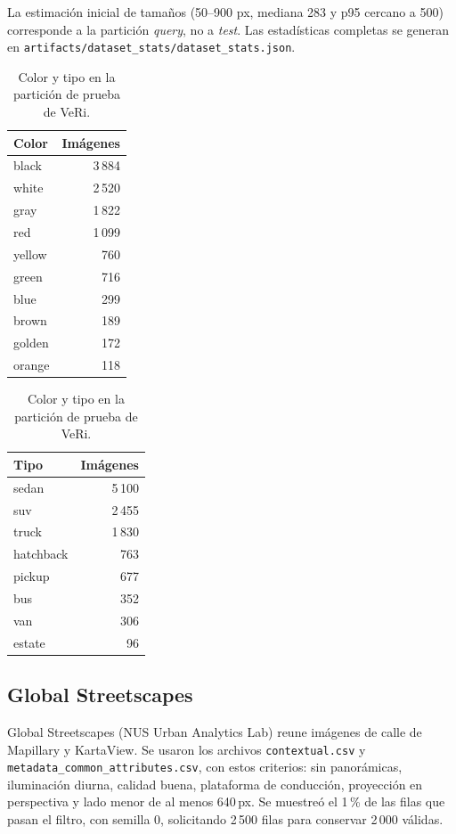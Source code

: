 \documentclass[11pt,a4paper]{article}
\begin{document}
La estimaci\'on inicial de tama\~nos (50--900 px, mediana 283 y p95 cercano a 500)
corresponde a la partici\'on \emph{query}, no a \emph{test}. Las estad\'isticas completas
se generan en \texttt{artifacts/dataset\_stats/dataset\_stats.json}.

\begin{table}[ht]
\centering
\begin{minipage}[t]{0.45\textwidth}
\centering
\begin{tabular}{@{}lr@{}}
\toprule
Color & Im\'agenes \\
\midrule
black & 3\,884 \\ white & 2\,520 \\ gray & 1\,822 \\ red & 1\,099 \\
yellow & 760 \\ green & 716 \\ blue & 299 \\ brown & 189 \\
golden & 172 \\ orange & 118 \\
\bottomrule
\end{tabular}
\end{minipage}\hfill
\begin{minipage}[t]{0.45\textwidth}
\centering
\begin{tabular}{@{}lr@{}}
\toprule
Tipo & Im\'agenes \\
\midrule
sedan & 5\,100 \\ suv & 2\,455 \\ truck & 1\,830 \\ hatchback & 763 \\
pickup & 677 \\ bus & 352 \\ van & 306 \\ estate & 96 \\
\bottomrule
\end{tabular}
\end{minipage}
\caption{Color y tipo en la partici\'on de prueba de VeRi.}
\end{table}

\subsection{Global Streetscapes}

Global Streetscapes (NUS Urban Analytics Lab) reune im\'agenes de calle de Mapillary y
KartaView. Se usaron los archivos \texttt{contextual.csv} y
\texttt{metadata\_common\_attributes.csv}, con estos criterios: sin panor\'amicas,
iluminaci\'on diurna, calidad buena, plataforma de conducci\'on, proyecci\'on en
perspectiva y lado menor de al menos 640\,px. Se muestre\'o el 1\,\% de las filas que
pasan el filtro, con semilla 0, solicitando 2\,500 filas para conservar 2\,000 v\'alidas.
\end{document}

